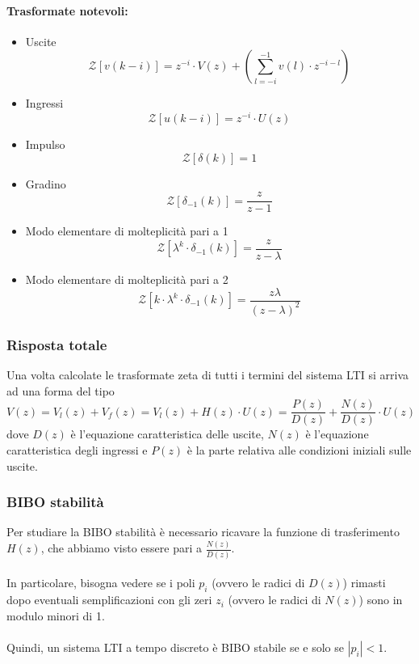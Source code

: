 \documentclass[a4paper]{article}
\begin{document}
	\paragraph{Trasformate notevoli:}
	\begin{itemize}
		\item Uscite
			\[
			\mathcal{Z} \left[ v(k-i) \right] = z^{-i} \cdot V(z) + \left( \sum_{l=-i}^{-1} v(l) \cdot z^{-i-l} \right)
			\]
		\item Ingressi
			\[
			\mathcal{Z} \left[ u(k-i) \right] = z^{-i} \cdot U(z)
			\]
		\item Impulso
			\[
			\mathcal{Z} \left[ \delta(k) \right] = 1
			\]
		\item Gradino
			\[
			\mathcal{Z} \left[ \delta_{-1}(k) \right] = \frac{z}{z - 1}
			\]
		\item Modo elementare di molteplicità pari a 1
			\[
			\mathcal{Z} \left[ \lambda^k \cdot \delta_{-1}(k) \right] = \frac{z}{z - \lambda}
			\]
		\item Modo elementare di molteplicità pari a 2
			\[
			\mathcal{Z} \left[ k \cdot \lambda^k \cdot \delta_{-1}(k) \right] = \frac{z \lambda}{(z - \lambda)^2}
			\]
	\end{itemize}
	
	\subsubsection{Risposta totale}
	Una volta calcolate le trasformate zeta di tutti i termini del sistema LTI si arriva ad una forma del tipo
	\[ V(z) = V_l(z) + V_f(z) = V_l(z) + H(z) \cdot U(z) = \frac{P(z)}{D(z)} + \frac{N(z)}{D(z)} \cdot U(z) \]
	dove $D(z)$ è l'equazione caratteristica delle uscite, $N(z)$ è l'equazione caratteristica degli ingressi e $P(z)$ è la parte relativa alle condizioni iniziali sulle uscite.
	
	\subsubsection{BIBO stabilità}
	Per studiare la BIBO stabilità è necessario ricavare la funzione di trasferimento $H(z)$, che abbiamo visto essere pari a $\frac{N(z)}{D(z)}$.
	\\ \\
	In particolare, bisogna vedere se i poli $p_i$ (ovvero le radici di $D(z)$) rimasti dopo eventuali semplificazioni con gli zeri $z_i$ (ovvero le radici di $N(z)$) sono in modulo minori di 1.
	\\ \\
	Quindi, un sistema LTI a tempo discreto è BIBO stabile se e solo se $|p_i|<1$.
	
\end{document}
